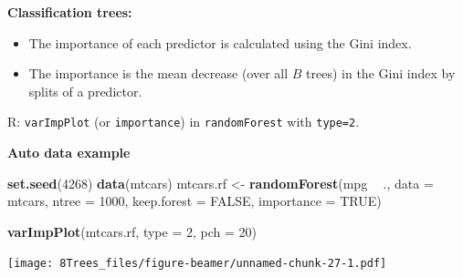 \documentclass[10pt,ignorenonframetext,]{beamer}
\newenvironment{Shaded}{\begin{snugshade}}{\end{snugshade}}
\newcommand{\KeywordTok}[1]{\textcolor[rgb]{0.13,0.29,0.53}{\textbf{#1}}}
\newcommand{\DataTypeTok}[1]{\textcolor[rgb]{0.13,0.29,0.53}{#1}}
\newcommand{\DecValTok}[1]{\textcolor[rgb]{0.00,0.00,0.81}{#1}}
\newcommand{\StringTok}[1]{\textcolor[rgb]{0.31,0.60,0.02}{#1}}
\newcommand{\OtherTok}[1]{\textcolor[rgb]{0.56,0.35,0.01}{#1}}
\newcommand{\OperatorTok}[1]{\textcolor[rgb]{0.81,0.36,0.00}{\textbf{#1}}}
\newcommand{\NormalTok}[1]{#1}
\providecommand{\tightlist}{%
  \setlength{\itemsep}{0pt}\setlength{\parskip}{0pt}}
\begin{document}
\begin{frame}[fragile]

\textbf{Classification trees:}

\begin{itemize}
\tightlist
\item
  The importance of each predictor is calculated using the Gini index.
\item
  The importance is the mean decrease (over all \(B\) trees) in the Gini
  index by splits of a predictor.
\end{itemize}

R: \texttt{varImpPlot} (or \texttt{importance}) in \texttt{randomForest}
with \texttt{type=2}.

\end{frame}

\begin{frame}[fragile]

\textbf{Auto data example}

\begin{Shaded}
\begin{Highlighting}[]
\KeywordTok{set.seed}\NormalTok{(}\DecValTok{4268}\NormalTok{)}
\KeywordTok{data}\NormalTok{(mtcars)}
\NormalTok{mtcars.rf <-}\StringTok{ }\KeywordTok{randomForest}\NormalTok{(mpg }\OperatorTok{~}\StringTok{ }\NormalTok{., }\DataTypeTok{data =}\NormalTok{ mtcars, }\DataTypeTok{ntree =} \DecValTok{1000}\NormalTok{, }\DataTypeTok{keep.forest =} \OtherTok{FALSE}\NormalTok{, }
    \DataTypeTok{importance =} \OtherTok{TRUE}\NormalTok{)}
\end{Highlighting}
\end{Shaded}

\end{frame}

\begin{frame}[fragile]

\begin{Shaded}
\begin{Highlighting}[]
\KeywordTok{varImpPlot}\NormalTok{(mtcars.rf, }\DataTypeTok{type =} \DecValTok{2}\NormalTok{, }\DataTypeTok{pch =} \DecValTok{20}\NormalTok{)}
\end{Highlighting}
\end{Shaded}

\texttt{[image: 8Trees\_files/figure-beamer/unnamed-chunk-27-1.pdf]}

\end{frame}
\end{document}
